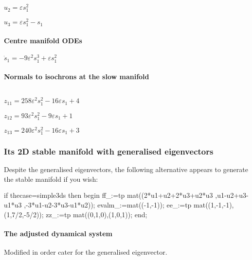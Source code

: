\documentclass[11pt,a5paper]{article}
\def\eps{\varepsilon}
\begin{document}
\begin{math}
u_{2}=\varepsilon  s_{1}^{2}
\end{math}\par

\begin{math}
u_{3}=\varepsilon  s_{1}^{2}-s_{1}
\end{math}\par


\paragraph{Centre manifold ODEs} 

\begin{math}
\dot s_{1}=-9 \varepsilon ^{2} s_{1}^{3}+\varepsilon  s_{1}^{2}
\end{math}

\paragraph{Normals to isochrons at the slow manifold}
\(
\)\par

\(z_{11}=258 \eps^{2} s_{1}^{2}-16 \eps s_{1}+4
\)\par

\(z_{12}=93 \eps^{2} s_{1}^{2}-9 \eps s_{1}+1
\)\par

\(z_{13}=240 \eps^{2} s_{1}^{2}-16 \eps s_{1}+3
\)\par





\subsubsection{Its 2D stable manifold with generalised eigenvectors}

Despite the generalised eigenvectors, the following alternative appears to generate the stable manifold if you wish:
\begin{reduce}
if thecase=simple3ds then begin
ff_:=tp mat((2*u1+u2+2*u3+u2*u3
  ,u1-u2+u3-u1*u3
  ,-3*u1-u2-3*u3-u1*u2));
evalm_:=mat((-1,-1));
ee_:=tp mat((1,-1,-1),(1,7/2,-5/2));
zz_:=tp mat((0,1,0),(1,0,1));
end;
\end{reduce}

\paragraph{The adjusted dynamical system}
Modified in order cater for the generalised eigenvector.
\end{document}
